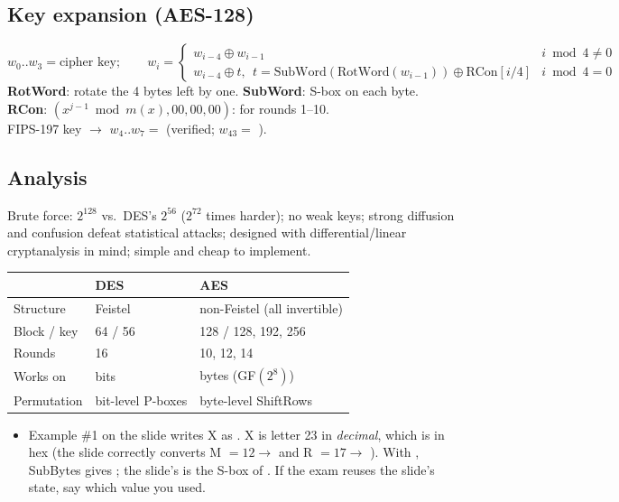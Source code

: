 \subsection{Key expansion (AES-128)}
\[
w_0..w_3 = \text{cipher key};\qquad
w_i = \begin{cases} w_{i-4} \oplus w_{i-1} & i \bmod 4 \ne 0\\ w_{i-4} \oplus t,\ \ t = \text{SubWord}(\text{RotWord}(w_{i-1})) \oplus \text{RCon}[i/4] & i \bmod 4 = 0\end{cases}
\]
\textbf{RotWord}: rotate the 4 bytes left by one. \textbf{SubWord}: S-box on each byte. \textbf{RCon}: $(x^{j-1} \bmod m(x), 00, 00, 00)$:  for rounds 1--10.\\
FIPS-197 key  $\to$ $w_4..w_7 =$  (verified; $w_{43} =$ ).

\subsection{Analysis}
Brute force: $2^{128}$ vs.\ DES's $2^{56}$ ($2^{72}$ times harder); no weak keys; strong diffusion and confusion defeat statistical attacks; designed with differential/linear cryptanalysis in mind; simple and cheap to implement.

\begin{center}\small
\begin{tabularx}{\textwidth}{@{}l X X@{}}
\toprule
 & DES & AES\\
\midrule
Structure & Feistel & non-Feistel (all invertible)\\
Block / key & 64 / 56 & 128 / 128, 192, 256\\
Rounds & 16 & 10, 12, 14\\
Works on & bits & bytes (GF$(2^8)$)\\
Permutation & bit-level P-boxes & byte-level ShiftRows\\
\bottomrule
\end{tabularx}
\end{center}

\begin{fixbox}
\begin{itemize}
  \item Example \#1 on the slide writes X as . X is letter 23 in \emph{decimal}, which is  in hex (the slide correctly converts M $= 12 \to$  and R $= 17 \to$ ). With , SubBytes gives ; the slide's  is the S-box of . If the exam reuses the slide's state, say which value you used.
\end{itemize}
\end{fixbox}
